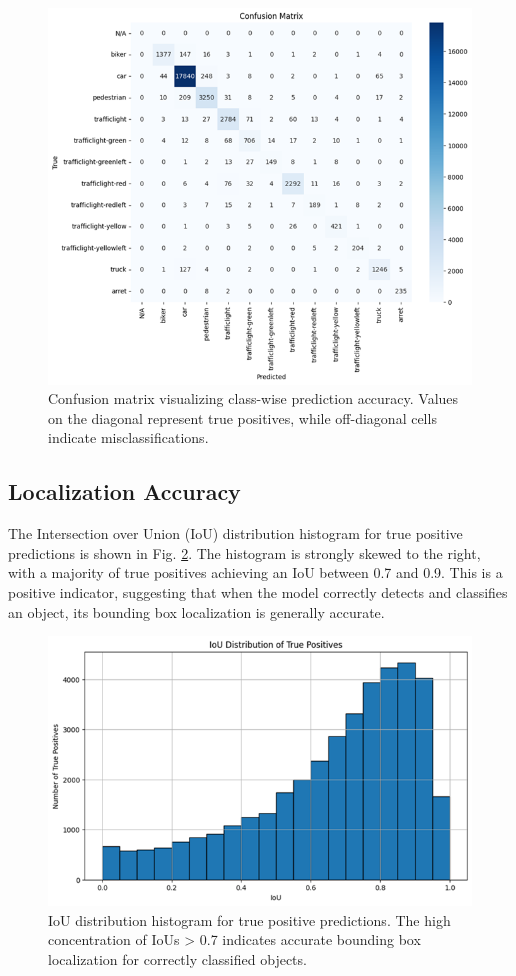 \documentclass[10pt, conference]{IEEEtran}
\begin{document}
\begin{figure}[h!]
    \centering
    \includegraphics[width=0.9\linewidth]{images/confusion_matrix.png}
    \caption{Confusion matrix visualizing class-wise prediction accuracy. Values on the diagonal represent true positives, while off-diagonal cells indicate misclassifications.}
    \label{fig:confusion_matrix}
\end{figure}

\subsection{Localization Accuracy}
The Intersection over Union (IoU) distribution histogram for true positive predictions is shown in Fig. \ref{fig:iou_hist}. The histogram is strongly skewed to the right, with a majority of true positives achieving an IoU between 0.7 and 0.9. This is a positive indicator, suggesting that when the model correctly detects and classifies an object, its bounding box localization is generally accurate.

\begin{figure}[h!]
    \centering
    \includegraphics[width=0.9\linewidth]{images/iou_distribution.png}
    \caption{IoU distribution histogram for true positive predictions. The high concentration of IoUs > 0.7 indicates accurate bounding box localization for correctly classified objects.}
    \label{fig:iou_hist}
\end{figure}
\end{document}
